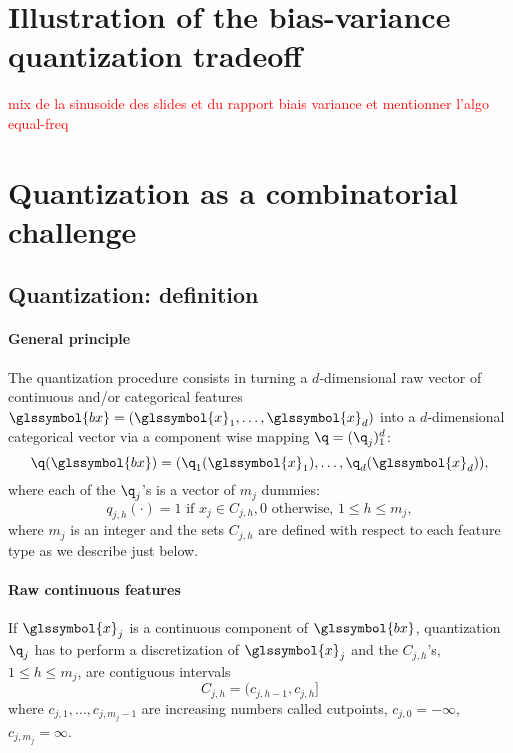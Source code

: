 \section{Illustration of the bias-variance quantization tradeoff}
 
 
 \textcolor{red}{mix de la sinusoide des slides et du rapport biais variance et mentionner l'algo equal-freq}
 
 
 
 
\section{Quantization as a combinatorial challenge} \label{sec:model_selection}

\subsection{Quantization: definition}

\paragraph{General principle}

The quantization procedure consists in turning a $d$-dimensional raw vector of continuous and/or categorical features $\glssymbol{bx} = (\glssymbol{x}_1, \ldots, \glssymbol{x}_d)$ into a $d$-dimensional categorical vector via a component wise mapping $\q=(\q_j)_1^d$:
\[\q(\glssymbol{bx})=(\q_1(\glssymbol{x}_1),\ldots,\q_d(\glssymbol{x}_d)),\]
where each of the $\q_j$'s is a vector of $m_j$ dummies: 
\begin{equation}\label{eq:qj}
q_{j,h}(\cdot) =  1 \text{ if } x_j \in C_{j,h}, 0 \text{ otherwise, } 1 \leq h \leq m_j,
\end{equation}
where $m_j$ is an integer and the sets $C_{j,h}$ are defined with respect to each feature type as we describe just below.
\paragraph{Raw continuous features} If $\glssymbol{x}_j$ is a continuous component of $\glssymbol{bx}$, quantization $\q_j$ has to perform a discretization of $\glssymbol{x}_j$ and the $C_{j,h}$'s, $1\le h\le m_j$, are contiguous intervals  
\begin{equation}\label{eq:Cjhcont}
C_{j,h}=(c_{j,h-1},c_{j,h}]
\end{equation}
where $c_{j,1},\ldots,c_{j,m_j-1}$ are increasing numbers called cutpoints, $c_{j,0}=-\infty$, $c_{j,m_j}=\infty$.

